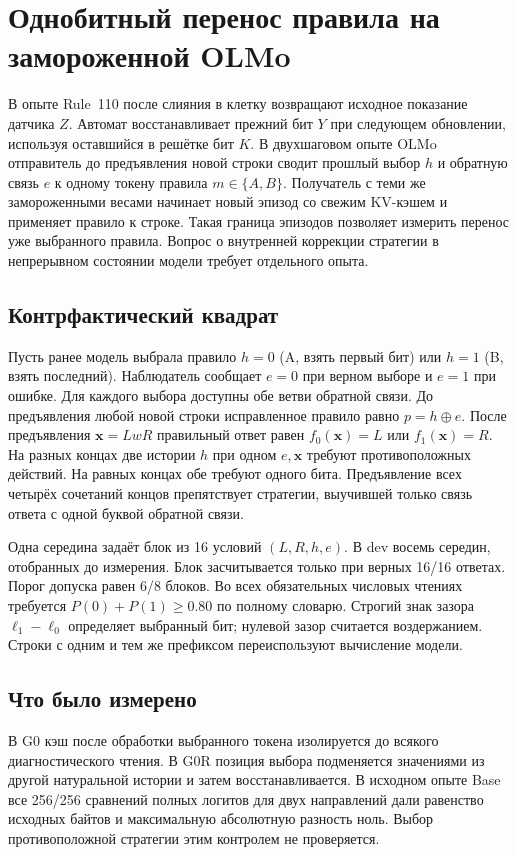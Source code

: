 \section{Однобитный перенос правила на замороженной OLMo}
\label{sec:olmo}
В опыте Rule~110 после слияния в клетку возвращают исходное показание датчика $Z$. Автомат восстанавливает прежний бит $Y$ при следующем обновлении, используя оставшийся в решётке бит $K$. В двухшаговом опыте OLMo отправитель до предъявления новой строки сводит прошлый выбор $h$ и обратную связь $e$ к одному токену правила $m\in\{A,B\}$. Получатель с теми же замороженными весами начинает новый эпизод со свежим KV-кэшем и применяет правило к строке. Такая граница эпизодов позволяет измерить перенос уже выбранного правила. Вопрос о внутренней коррекции стратегии в непрерывном состоянии модели требует отдельного опыта.

\subsection{Контрфактический квадрат}
Пусть ранее модель выбрала правило $h=0$ (A, взять первый бит) или $h=1$ (B, взять последний). Наблюдатель сообщает $e=0$ при верном выборе и $e=1$ при ошибке. Для каждого выбора доступны обе ветви обратной связи. До предъявления любой новой строки исправленное правило равно $p=h\oplus e$. После предъявления $\mathbf{x}=LwR$ правильный ответ равен $f_0(\mathbf{x})=L$ или $f_1(\mathbf{x})=R$. На разных концах две истории $h$ при одном $e,\mathbf{x}$ требуют противоположных действий. На равных концах обе требуют одного бита. Предъявление всех четырёх сочетаний концов препятствует стратегии, выучившей только связь ответа с одной буквой обратной связи.

Одна середина задаёт блок из 16 условий $(L,R,h,e)$. В dev восемь середин, отобранных до измерения. Блок засчитывается только при верных 16/16 ответах. Порог допуска равен 6/8 блоков. Во всех обязательных числовых чтениях требуется $P(0)+P(1)\ge0.80$ по полному словарю. Строгий знак зазора $\ell_1-\ell_0$ определяет выбранный бит; нулевой зазор считается воздержанием. Строки с одним и тем же префиксом переиспользуют вычисление модели.

\subsection{Что было измерено}
В G0 кэш после обработки выбранного токена изолируется до всякого диагностического чтения. В G0R позиция выбора подменяется значениями из другой натуральной истории и затем восстанавливается. В исходном опыте Base все 256/256 сравнений полных логитов для двух направлений дали равенство исходных байтов и максимальную абсолютную разность ноль. Выбор противоположной стратегии этим контролем не проверяется.

